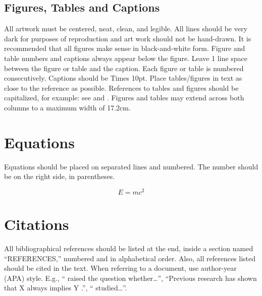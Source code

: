 \documentclass{article}
\begin{document}
\subsection{Figures, Tables and Captions}

All artwork must be centered, neat, clean, and legible. 
All lines should be very dark for purposes of reproduction and art work should not be hand-drawn. 
It is recommended that all figures make sense in black-and-white form. 
Figure and table numbers and captions always appear below the figure. 
Leave 1 line space between the figure or table and the caption. 
Each figure or table is numbered consecutively. Captions should be Times 10pt. 
Place tables/figures in text as close to the reference as possible. 
References to tables and figures should be capitalized, for example: 
see  and . 
Figures and tables may extend across both columns to a maximum width of 17.2cm.


\section{Equations}

Equations should be placed on separated lines and numbered.
The number should be on the right side, in parentheses.

\begin{equation}
E=mc^{2}
\end{equation}

\section{Citations}

All bibliographical references should be listed at the end, 
inside a section named ``REFERENCES,'' numbered and in alphabetical order. 
Also, all references listed should be cited in the text. 
When referring to a document, use author-year (APA) style. E.g., ``\citet{Someone2010} raised the question whether\dots{}'', ``Previous research has shown that X always implies Y \citep{Smith2005,Author2000}.'', ``\citet{Writer2004} studied\dots''.



\end{document}
